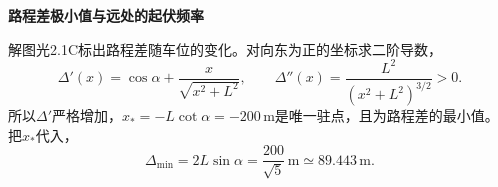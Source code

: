 \documentclass[UTF8,fontset=fandol,a4paper,11pt]{ctexart}
\begin{document}
\par\noindent\textbf{路程差极小值与远处的起伏频率}

解图光2.1C标出路程差随车位的变化。对向东为正的坐标求二阶导数，
\[
\Delta'(x)=\cos\alpha+\frac{x}{\sqrt{x^2+L^2}},\qquad
\Delta''(x)=\frac{L^2}{(x^2+L^2)^{3/2}}>0.
\]
所以$\Delta'$严格增加，$x_*=-L\cot\alpha=-200\,\mathrm m$是唯一驻点，且为路程差的最小值。把$x_*$代入，
\[
\Delta_{\min}=2L\sin\alpha=\frac{200}{\sqrt5}\,\mathrm m
\simeq89.443\,\mathrm m.
\]

\begin{center}\begin{minipage}{.97\linewidth}\centering
{}
\end{minipage}
\end{center}
\end{document}
